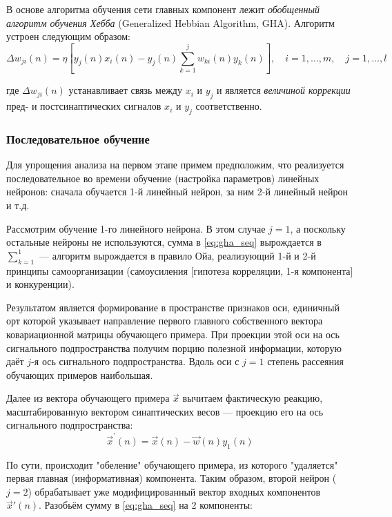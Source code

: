 \documentclass[a4paper]{article}
\numberwithin{equation}{subsection}
\begin{document}
В основе алгоритма обучения сети главных компонент лежит \textit{обобщенный алгоритм обучения Хебба} 
(Generalized Hebbian Algorithm, GHA).
Алгоритм устроен следующим образом:
\begin{equation}
    \Delta w _{ji}(n) = \eta 
    \left[
        y_j(n) x_i(n) - y_j(n) \sum_{k=1}^j w_{ki}(n) y_k(n) 
    \right], \quad i = 1, \dots, m,\quad j=1, \dots, l
    \label{eq:gha_seq}
\end{equation}

\noindent
где $\Delta w_{ji}(n)$ устанавливает связь между $x_i$ и $y_j$ и является \textit{величиной коррекции}
пред- и постсинаптических сигналов $x_i$ и $y_j$ соответственно.




\subsubsection{Последовательное обучение}

Для упрощения анализа на первом этапе примем предположим, что реализуется последовательное
во времени обучение (настройка параметров) линейных нейронов: сначала обучается 1-й линейный нейрон,
за ним 2-й линейный нейрон и т.д.

Рассмотрим обучение 1-го линейного нейрона. В этом случае $j=1$, а поскольку остальные нейроны
не используются, сумма в \ref{eq:gha_seq} вырождается в $\sum_{k=1}^1$ --- алгоритм вырождается 
в правило Ойа, реализующий 1-й и 2-й принципы самоорганизации (самоусиления [гипотеза корреляции, 
1-я компонента] и конкуренции).

Результатом является формирование в пространстве признаков оси, единичный орт которой указывает
направление первого главного собственного вектора ковариационной матрицы обучающего примера. 
При проекции этой оси на ось сигнального подпространства получим порцию полезной информации, 
которую даёт $j$-я ось сигнального подпространства.
Вдоль оси с $j=1$ степень рассеяния обучающих примеров наибольшая.

Далее из вектора обучающего примера $\vec{x}$ вычитаем фактическую реакцию, масштабированную вектором
синаптических весов --- проекцию его на ось сигнального подпространства:
\begin{equation}
    \vec{x}^\prime(n) = \vec{x}(n) - \vec{w}(n) y_1(n)
    \label{eq:first_main_comp}
\end{equation}

По сути, происходит "обеление" обучающего примера, из которого "удаляется" первая главная 
(информативная) компонента. Таким образом, второй нейрон ($j=2$) обрабатывает уже 
модифицированный вектор входных компонентов $\vec{x}'(n)$.
Разобьём сумму в \ref{eq:gha_seq} на 2 компоненты:
\end{document}

